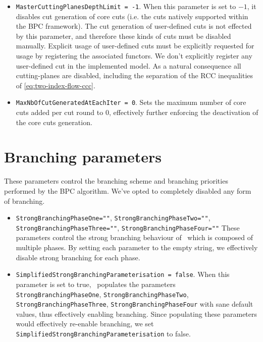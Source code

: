 \begin{itemize}
	\item \texttt{MasterCuttingPlanesDepthLimit = -1}.
	      When this parameter is set to $-1$, it disables cut generation of core cuts
	      (i.e. the cuts natively supported within the BPC framework).
	      The cut generation of user-defined cuts
	      is not effected by this parameter, and therefore these kinds of cuts must be disabled manually.
	      Explicit usage of user-defined cuts must be explicitly requested for usage
	      by registering the associated functors.
	      We don't explicitly register any user-defined cut in the implemented model.
	      As a natural consequence all cutting-planes are disabled, including the separation of the RCC inequalities of \cref{eq:two-index-flow-ccc}.
	\item \texttt{MaxNbOfCutGeneratedAtEachIter = 0}.
	      Sets the maximum number of core cuts added per cut round to $0$,
	      effectively further enforcing the deactivation of the core cuts generation.
\end{itemize}

\section{Branching parameters}
These parameters control the branching scheme and branching priorities performed by the BPC algorithm.
We've opted to completely disabled any form of branching.

\begin{itemize}
	\item \texttt{StrongBranchingPhaseOne=""}, \texttt{StrongBranchingPhaseTwo=""}, \texttt{StrongBranchingPhaseThree=""}, \texttt{StrongBranchingPhaseFour=""}
	      These parameters control the strong branching behaviour of \bapcod\, which is composed of multiple phases.
	      By setting each parameter to the empty string, we effectively disable strong branching for each phase.
	\item \texttt{SimplifiedStrongBranchingParameterisation = false}.
	      When this parameter is set to true, \bapcod\ populates the parameters \texttt{StrongBranchingPhaseOne}, \texttt{StrongBranchingPhaseTwo}, \texttt{StrongBranchingPhaseThree}, \texttt{StrongBranchingPhaseFour}
	      with sane default values, thus effectively enabling branching.
	      Since populating these parameters would effectively re-enable branching, we set \texttt{SimplifiedStrongBranchingParameterisation} to false.
\end{itemize}

